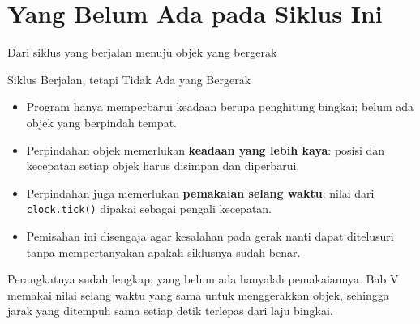\documentclass[aspectratio=169,10pt]{beamer}
\begin{document}
\section{Yang Belum Ada pada Siklus Ini}
  {Dari siklus yang berjalan menuju objek yang bergerak}

\begin{frame}{Siklus Berjalan, tetapi Tidak Ada yang Bergerak}
\begin{itemize}
  \item Program hanya memperbarui keadaan berupa penghitung bingkai; belum ada
        objek yang berpindah tempat.
  \item Perpindahan objek memerlukan \textbf{keadaan yang lebih kaya}: posisi
        dan kecepatan setiap objek harus disimpan dan diperbarui.
  \item Perpindahan juga memerlukan \textbf{pemakaian selang waktu}: nilai dari
        \texttt{clock.tick()} dipakai sebagai pengali kecepatan.
  \item Pemisahan ini disengaja agar kesalahan pada gerak nanti dapat
        ditelusuri tanpa mempertanyakan apakah siklusnya sudah benar.
\end{itemize}
\begin{kotak}
Perangkatnya sudah lengkap; yang belum ada hanyalah pemakaiannya. Bab V memakai
nilai selang waktu yang sama untuk menggerakkan objek, sehingga jarak yang
ditempuh sama setiap detik terlepas dari laju bingkai.
\end{kotak}
\end{frame}
\end{document}
